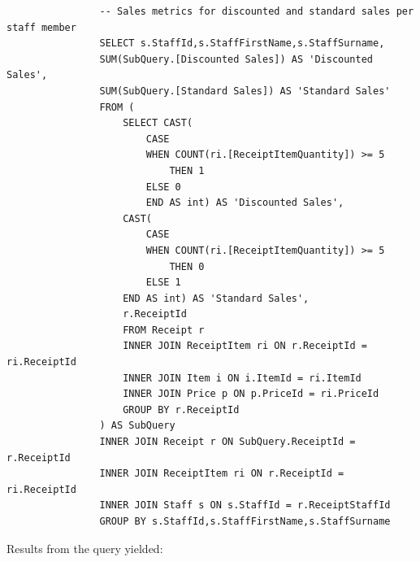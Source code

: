 \documentclass{article}
\begin{document}
            \begin{lstlisting}
                -- Sales metrics for discounted and standard sales per staff member
                SELECT s.StaffId,s.StaffFirstName,s.StaffSurname,
                SUM(SubQuery.[Discounted Sales]) AS 'Discounted Sales',
                SUM(SubQuery.[Standard Sales]) AS 'Standard Sales'
                FROM (
                    SELECT CAST(
                        CASE
                        WHEN COUNT(ri.[ReceiptItemQuantity]) >= 5
                            THEN 1
                        ELSE 0
                        END AS int) AS 'Discounted Sales',
                    CAST(
                        CASE
                        WHEN COUNT(ri.[ReceiptItemQuantity]) >= 5
                            THEN 0
                        ELSE 1
                    END AS int) AS 'Standard Sales',
                    r.ReceiptId
                    FROM Receipt r
                    INNER JOIN ReceiptItem ri ON r.ReceiptId = ri.ReceiptId
                    INNER JOIN Item i ON i.ItemId = ri.ItemId
                    INNER JOIN Price p ON p.PriceId = ri.PriceId
                    GROUP BY r.ReceiptId
                ) AS SubQuery
                INNER JOIN Receipt r ON SubQuery.ReceiptId = r.ReceiptId
                INNER JOIN ReceiptItem ri ON r.ReceiptId = ri.ReceiptId
                INNER JOIN Staff s ON s.StaffId = r.ReceiptStaffId
                GROUP BY s.StaffId,s.StaffFirstName,s.StaffSurname
            \end{lstlisting}

            \newpage
            Results from the query yielded:
\end{document}
